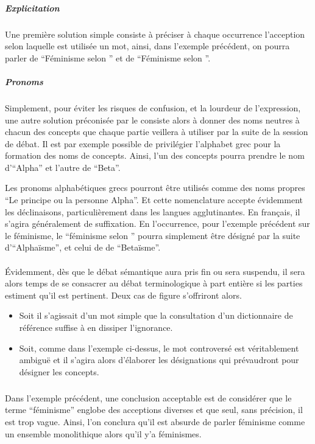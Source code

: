 \paragraph{}
\subparagraph{Explicitation}
Une première solution simple consiste à préciser à chaque occurrence l’acception selon laquelle est utilisée un mot, ainsi, dans l’exemple précédent, on pourra parler de \enquote{Féminisme selon \A} et de \enquote{Féminisme selon \B}.

\subparagraph{Pronoms}
Simplement, pour éviter les risques de confusion, et la lourdeur de l’expression, une autre solution préconisée par le \mainabbr{} consiste alors à donner des noms neutres à chacun des concepts que chaque partie veillera à utiliser par la suite de la session de débat. Il est par exemple possible de privilégier l’alphabet grec pour la formation des noms de concepts. Ainsi, l’un des concepts pourra prendre le nom d’\enquote{Alpha} et l’autre de \enquote{Beta}.

Les pronoms alphabétiques grecs pourront être utilisés comme des noms propres \enquote{Le principe ou la personne Alpha}. Et cette nomenclature accepte évidemment les déclinaisons, particulièrement dans les langues agglutinantes. En français, il s’agira généralement de suffixation. En l’occurrence, pour l’exemple précédent sur le féminisme, le \enquote{féminisme selon \A} pourra simplement être désigné par la suite d’\enquote{Alphaïsme}, et celui de \B de \enquote{Betaïsme}.

\paragraph{}
Évidemment, dès que le débat sémantique aura pris fin ou sera suspendu, il sera alors temps de se consacrer au débat terminologique à part entière si les parties estiment qu’il est pertinent. Deux cas de figure s’offriront alors.
\begin{itemize}
  \item Soit il s’agissait d’un mot simple que la consultation d’un dictionnaire de référence suffise à en dissiper l’ignorance.

  \item Soit, comme dans l’exemple ci-dessus, le mot controversé est véritablement ambiguë et il s’agira alors d’élaborer les désignations qui prévaudront pour désigner les concepts.
\end{itemize}

\subparagraph{}
Dans l’exemple précédent, une conclusion acceptable est de considérer que le terme \enquote{féminisme} englobe des acceptions diverses et que seul, sans précision, il est trop vague. Ainsi, l’on conclura qu’il est absurde de parler  féminisme comme un ensemble monolithique alors qu’il y’a  féminismes.


